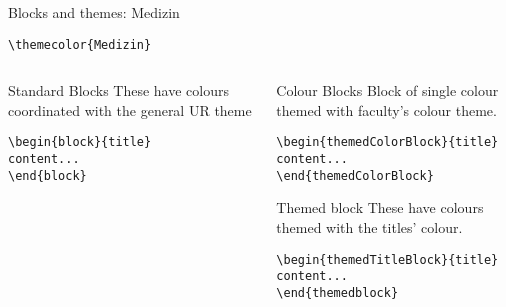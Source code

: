 \begingroup
{}
\begin{frame}[fragile]{Blocks and themes: Medizin}
    \begin{center}\verb|\themecolor{Medizin}|\end{center}
\begin{columns} %
\begin{column}{0.3\textwidth}
\begin{block}{Standard Blocks}
These have colours coordinated with the general UR theme
\begin{verbatim}
\begin{block}{title}
content...
\end{block}
\end{verbatim}
\end{block}
\end{column}
\begin{column}{0.7\textwidth}
\begin{themedColorBlock}{Colour Blocks}
Block of single colour themed with faculty's colour theme.
\small
\begin{verbatim}
\begin{themedColorBlock}{title}
content...
\end{themedColorBlock}
\end{verbatim}
\end{themedColorBlock}
\begin{themedTitleBlock} {Themed block}
These have colours themed with the titles' colour.
\small
\begin{verbatim}
\begin{themedTitleBlock}{title}
content...
\end{themedblock}
\end{verbatim}
\end{themedTitleBlock}
\end{column}
\end{columns}
\end{frame}
\endgroup



